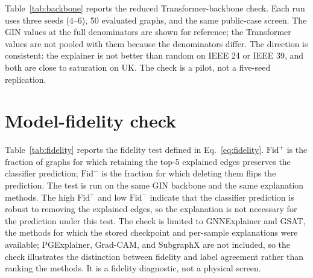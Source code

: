 Table~\ref{tab:backbone} reports the reduced Transformer-backbone check. Each run uses three seeds (4--6), 50 evaluated graphs, and the same public-case screen. The GIN values at the full denominators are shown for reference; the Transformer values are not pooled with them because the denominators differ. The direction is consistent: the explainer is not better than random on IEEE 24 or IEEE 39, and both are close to saturation on UK. The check is a pilot, not a five-seed replication.

\begin{table}[h]
\centering
\caption{Transformer-backbone pilot (three seeds, 50 graphs per run) compared with the full-slice GIN result. Transformer values are mean PFR over seeds 4--6; GIN values are the full-slice estimates from Table~\ref{tab:outcomes}.}
\label{tab:backbone}
\scriptsize
{}
\end{table}

\section{Model-fidelity check}\label{appendix:fidelity}
\setcounter{table}{0}

Table~\ref{tab:fidelity} reports the fidelity test defined in Eq.~\eqref{eq:fidelity}. $\mathrm{Fid}^{+}$ is the fraction of graphs for which retaining the top-5 explained edges preserves the classifier prediction; $\mathrm{Fid}^{-}$ is the fraction for which deleting them flips the prediction. The test is run on the same GIN backbone and the same explanation methods. The high $\mathrm{Fid}^{+}$ and low $\mathrm{Fid}^{-}$ indicate that the classifier prediction is robust to removing the explained edges, so the explanation is not necessary for the prediction under this test. The check is limited to GNNExplainer and GSAT, the methods for which the stored checkpoint and per-sample explanations were available; PGExplainer, Grad-CAM, and SubgraphX are not included, so the check illustrates the distinction between fidelity and label agreement rather than ranking the methods. It is a fidelity diagnostic, not a physical screen.

